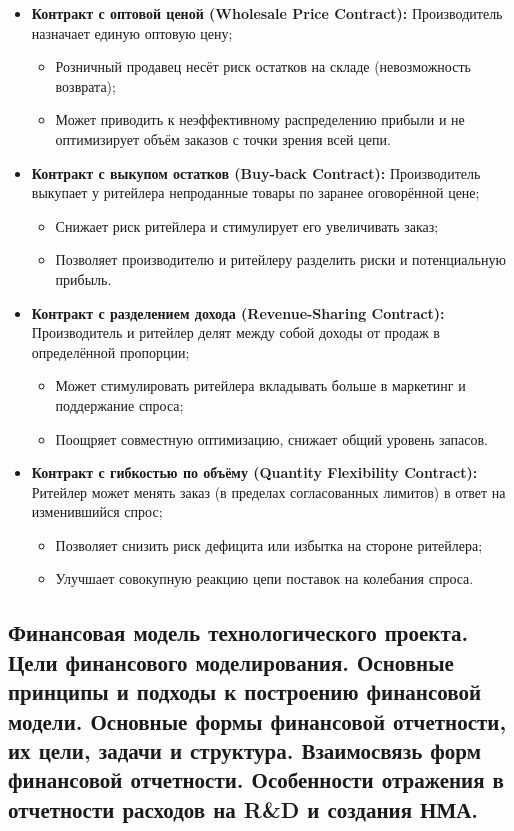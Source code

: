 \begin{itemize}
    \item \textbf{Контракт с оптовой ценой (Wholesale Price Contract):}
    Производитель назначает единую оптовую цену;
    \begin{itemize}
        \item Розничный продавец несёт риск остатков на складе (невозможность возврата);
        \item Может приводить к неэффективному распределению прибыли и не оптимизирует объём заказов с точки зрения всей цепи.
    \end{itemize}
    \item \textbf{Контракт с выкупом остатков (Buy-back Contract):}
    Производитель выкупает у ритейлера непроданные товары по заранее оговорённой цене;
    \begin{itemize}
        \item Снижает риск ритейлера и стимулирует его увеличивать заказ;
        \item Позволяет производителю и ритейлеру разделить риски и потенциальную прибыль.
    \end{itemize}
    \item \textbf{Контракт с разделением дохода (Revenue-Sharing Contract):}
    Производитель и ритейлер делят между собой доходы от продаж в определённой пропорции;
    \begin{itemize}
        \item Может стимулировать ритейлера вкладывать больше в маркетинг и поддержание спроса;
        \item Поощряет совместную оптимизацию, снижает общий уровень запасов.
    \end{itemize}
    \item \textbf{Контракт с гибкостью по объёму (Quantity Flexibility Contract):}
    Ритейлер может менять заказ (в пределах согласованных лимитов) в ответ на изменившийся спрос;
    \begin{itemize}
        \item Позволяет снизить риск дефицита или избытка на стороне ритейлера;
        \item Улучшает совокупную реакцию цепи поставок на колебания спроса.
    \end{itemize}
\end{itemize}

\pagebreak

\subsection{Финансовая модель технологического проекта. Цели финансового моделирования. Основные принципы и подходы к построению финансовой модели. Основные формы финансовой отчетности, их цели, задачи и структура. Взаимосвязь форм финансовой отчетности. Особенности отражения в отчетности расходов на R\&D и создания НМА.}

